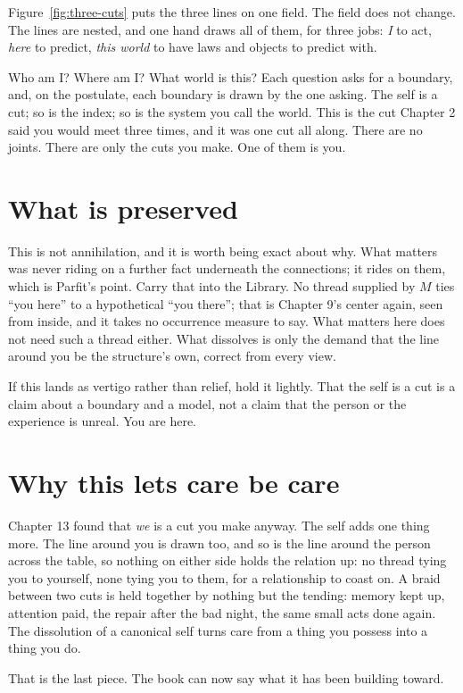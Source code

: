 Figure~\ref{fig:three-cuts} puts the three lines on one field. The field does not change. The lines are nested, and one hand draws all of them, for three jobs: \emph{I} to act, \emph{here} to predict, \emph{this world} to have laws and objects to predict with.

Who am I? Where am I? What world is this? Each question asks for a boundary, and, on the postulate, each boundary is drawn by the one asking. The self is a cut; so is the index; so is the system you call the world. This is the cut Chapter 2 said you would meet three times, and it was one cut all along. There are no joints. There are only the cuts you make. One of them is you.

\section*{What is preserved}

This is not annihilation, and it is worth being exact about why. What matters was never riding on a further fact underneath the connections; it rides on them, which is Parfit's point. Carry that into the Library. No thread supplied by $M$ ties ``you here'' to a hypothetical ``you there''; that is Chapter 9's center again, seen from inside, and it takes no occurrence measure to say. What matters here does not need such a thread either. What dissolves is only the demand that the line around you be the structure's own, correct from every view.

If this lands as vertigo rather than relief, hold it lightly. That the self is a cut is a claim about a boundary and a model, not a claim that the person or the experience is unreal. You are here.

\section*{Why this lets care be care}

Chapter 13 found that \emph{we} is a cut you make anyway. The self adds one thing more. The line around you is drawn too, and so is the line around the person across the table, so nothing on either side holds the relation up: no thread tying you to yourself, none tying you to them, for a relationship to coast on. A braid between two cuts is held together by nothing but the tending: memory kept up, attention paid, the repair after the bad night, the same small acts done again. The dissolution of a canonical self turns care from a thing you possess into a thing you do.

That is the last piece. The book can now say what it has been building toward.
